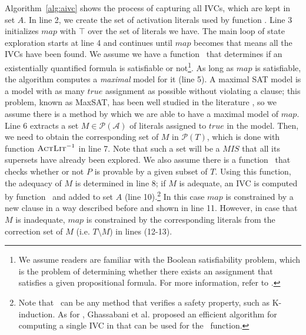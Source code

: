 

Algorithm~\ref{alg:aivc} shows the process of capturing all IVCs, which are kept in set $A$.
In line 2, we create the set of activation literals used by function \actlit . Line 3 initializes $map$ with $\top$ over the set of literals we have. The main loop of state exploration starts at line 4 and continues until $map$ becomes \unsat that means all the IVCs have been found. We assume we have a function \checksat ~that determines if an existentially quantified formula  is satisfiable or not\footnote{We assume readers are familiar with the Boolean satisfiability problem, which is the problem of determining whether there exists an assignment that satisfies a given propositional formula. For more information, refer to \cite{cook1971complexity}.}.
As long as $map$ is satisfiable, the algorithm computes a \emph{maximal} \sat model for it (line 5). A maximal SAT model is a model with as many $true$ assignment as possible without violating a clause; this problem, known as MaxSAT, has been well studied in the literature \cite{cimatti2013modular, davies2011solving, morgado2013iterative}, so we assume there is a method by which we are able to have a maximal model of $map$.
Line 6 extracts a set $M \in \mathcal{P} (\mathcal{A})$ of literals assigned to $true$ in the model.
Then, we need to obtain the corresponding set of $M$ in $\mathcal{P}(T)$, which is done with function $\textsc{ActLit} ^{-1}$ in line 7. Note that such a set will be a $MIS$ that all its supersets have already been explored. We also assume there is a function \isadeq ~that checks whether or not $P$ is provable by a given subset of $T$. Using this function, the adequacy of $M$ is determined in line 8; if $M$ is adequate, an IVC  is computed by function \getivc ~and added to set $A$ (line 10).\footnote{Note that \isadeq ~can be any method that verifies a safety property, such as K-induction. As for \getivc , Ghassabani et al. proposed an efficient algorithm for computing a single IVC in \cite{Ghass16} that can be used for the \getivc ~function.} In this case $map$ is constrained by a new clause in a way described before and shown in line 11. However, in case that $M$ is inadequate, $map$ is constrained by the corresponding literals from the correction set of $M$ (i.e. $T \setminus M$) in lines (12-13).

